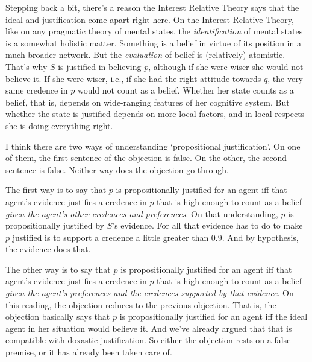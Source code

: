 {Stepping back a bit, there's a reason the Interest Relative Theory says that the ideal and justification come apart right here. On the Interest Relative Theory, like on any pragmatic theory of mental states, the \textit{identification} of mental states is a somewhat holistic matter. Something is a belief in virtue of its position in a much broader network. But the \textit{evaluation} of belief is (relatively) atomistic. That's why \(S\) is justified in believing \(p\), although if she were wiser she would not believe it. If she were wiser, i.e., if she had the right attitude towards \(q\), the very same credence in \(p\) would not count as a belief. Whether her state counts as a belief, that is, depends on wide-ranging features of her cognitive system. But whether the state is justified depends on more local factors, and in local respects she is doing everything right.}

{I think there are two ways of understanding `propositional justification'. On one of them, the first sentence of the objection is false. On the other, the second sentence is false. Neither way does the objection go through.

The first way is to say that \(p\) is propositionally justified for an agent iff that agent's evidence justifies a credence in \(p\) that is high enough to count as a belief \textit{given the agent's other credences and preferences}. On that understanding, \(p\) is propositionally justified by \(S\)'s evidence. For all that evidence has to do to make \(p\) justified is to support a credence a little greater than 0.9. And by hypothesis, the evidence does that.

The other way is to say that \(p\) is propositionally justified for an agent iff that agent's evidence justifies a credence in \(p\) that is high enough to count as a belief \textit{given the agent's preferences and the credences supported by that evidence}. On this reading, the objection reduces to the previous objection. That is, the objection basically says that \(p\) is propositionally justified for an agent iff the ideal agent in her situation would believe it. And we've already argued that that is compatible with doxastic justification. So either the objection rests on a false premise, or it has already been taken care of.}

